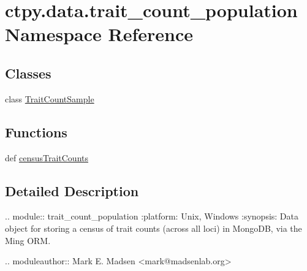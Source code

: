 \hypertarget{namespacectpy_1_1data_1_1trait__count__population}{\section{ctpy.\-data.\-trait\-\_\-count\-\_\-population Namespace Reference}
\label{namespacectpy_1_1data_1_1trait__count__population}
}
\subsection*{Classes}
\begin{DoxyCompactItemize}
\item 
class \hyperlink{classctpy_1_1data_1_1trait__count__population_1_1_trait_count_sample}{Trait\-Count\-Sample}
\end{DoxyCompactItemize}
\subsection*{Functions}
\begin{DoxyCompactItemize}
\item 
def \hyperlink{namespacectpy_1_1data_1_1trait__count__population_a6e0713fc8ab824a6f5850fbd75012577}{census\-Trait\-Counts}
\end{DoxyCompactItemize}


\subsection{Detailed Description}
\begin{DoxyVerb}.. module:: trait_count_population
:platform: Unix, Windows
:synopsis: Data object for storing a census of trait counts (across all loci) in MongoDB, via the Ming ORM.

.. moduleauthor:: Mark E. Madsen <mark@madsenlab.org>\end{DoxyVerb}
 

